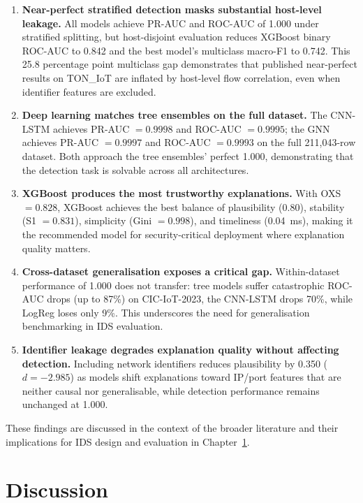\documentclass[12pt,a4paper]{report}
\begin{document}
\begin{enumerate}
  \item \textbf{Near-perfect stratified detection masks substantial host-level leakage.} All models achieve PR-AUC and ROC-AUC of 1.000 under stratified splitting, but host-disjoint evaluation reduces XGBoost binary ROC-AUC to 0.842 and the best model's multiclass macro-F1 to 0.742. This 25.8 percentage point multiclass gap demonstrates that published near-perfect results on TON\_IoT are inflated by host-level flow correlation, even when identifier features are excluded.
  \item \textbf{Deep learning matches tree ensembles on the full dataset.} The CNN-LSTM achieves PR-AUC $= 0.9998$ and ROC-AUC $= 0.9995$; the GNN achieves PR-AUC $= 0.9997$ and ROC-AUC $= 0.9993$ on the full 211,043-row dataset. Both approach the tree ensembles' perfect 1.000, demonstrating that the detection task is solvable across all architectures.
  \item \textbf{XGBoost produces the most trustworthy explanations.} With OXS $= 0.828$, XGBoost achieves the best balance of plausibility (0.80), stability (S1 $= 0.831$), simplicity (Gini $= 0.998$), and timeliness (0.04~ms), making it the recommended model for security-critical deployment where explanation quality matters.
  \item \textbf{Cross-dataset generalisation exposes a critical gap.} Within-dataset performance of 1.000 does not transfer: tree models suffer catastrophic ROC-AUC drops (up to 87\%) on CIC-IoT-2023, the CNN-LSTM drops 70\%, while LogReg loses only 9\%. This underscores the need for generalisation benchmarking in IDS evaluation.
  \item \textbf{Identifier leakage degrades explanation quality without affecting detection.} Including network identifiers reduces plausibility by 0.350 ($d = -2.985$) as models shift explanations toward IP/port features that are neither causal nor generalisable, while detection performance remains unchanged at 1.000.
\end{enumerate}

These findings are discussed in the context of the broader literature and their implications for IDS design and evaluation in Chapter~\ref{ch:discussion}.

\chapter{Discussion}
\label{ch:discussion}
\end{document}

